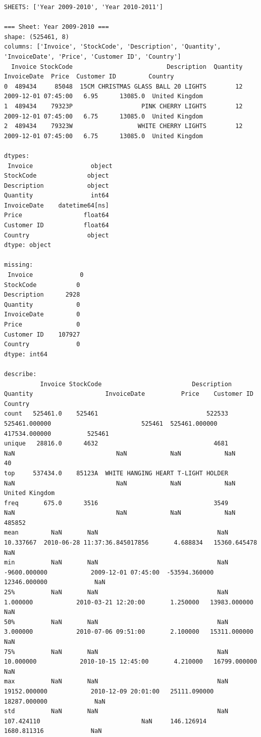 \documentclass[
]{ctexart}
\begin{document}
\begin{verbatim}
SHEETS: ['Year 2009-2010', 'Year 2010-2011']

=== Sheet: Year 2009-2010 ===
shape: (525461, 8)
columns: ['Invoice', 'StockCode', 'Description', 'Quantity', 'InvoiceDate', 'Price', 'Customer ID', 'Country']
  Invoice StockCode                          Description  Quantity         InvoiceDate  Price  Customer ID         Country
0  489434     85048  15CM CHRISTMAS GLASS BALL 20 LIGHTS        12 2009-12-01 07:45:00   6.95      13085.0  United Kingdom
1  489434    79323P                   PINK CHERRY LIGHTS        12 2009-12-01 07:45:00   6.75      13085.0  United Kingdom
2  489434    79323W                  WHITE CHERRY LIGHTS        12 2009-12-01 07:45:00   6.75      13085.0  United Kingdom

dtypes:
 Invoice                object
StockCode              object
Description            object
Quantity                int64
InvoiceDate    datetime64[ns]
Price                 float64
Customer ID           float64
Country                object
dtype: object

missing:
 Invoice             0
StockCode           0
Description      2928
Quantity            0
InvoiceDate         0
Price               0
Customer ID    107927
Country             0
dtype: int64

describe:
          Invoice StockCode                         Description       Quantity                    InvoiceDate          Price    Customer ID         Country
count   525461.0    525461                              522533  525461.000000                         525461  525461.000000  417534.000000          525461
unique   28816.0      4632                                4681            NaN                            NaN            NaN            NaN              40
top     537434.0    85123A  WHITE HANGING HEART T-LIGHT HOLDER            NaN                            NaN            NaN            NaN  United Kingdom
freq       675.0      3516                                3549            NaN                            NaN            NaN            NaN          485852
mean         NaN       NaN                                 NaN      10.337667  2010-06-28 11:37:36.845017856       4.688834   15360.645478             NaN
min          NaN       NaN                                 NaN   -9600.000000            2009-12-01 07:45:00  -53594.360000   12346.000000             NaN
25%          NaN       NaN                                 NaN       1.000000            2010-03-21 12:20:00       1.250000   13983.000000             NaN
50%          NaN       NaN                                 NaN       3.000000            2010-07-06 09:51:00       2.100000   15311.000000             NaN
75%          NaN       NaN                                 NaN      10.000000            2010-10-15 12:45:00       4.210000   16799.000000             NaN
max          NaN       NaN                                 NaN   19152.000000            2010-12-09 20:01:00   25111.090000   18287.000000             NaN
std          NaN       NaN                                 NaN     107.424110                            NaN     146.126914    1680.811316             NaN


\end{verbatim}
\end{document}
